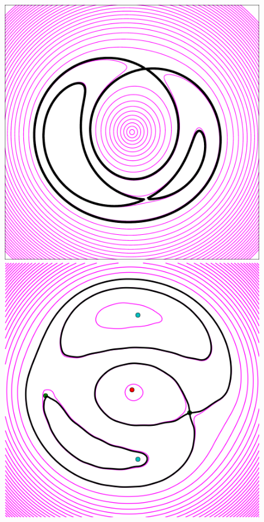 \begin{figure}
  \includegraphics[width=\myplotswidth]{fig/ASW0000h2m_007025_arriv}
  \includegraphics[width=\myplotswidth]{fig/007025_spaghetti} \\

\end{figure}
